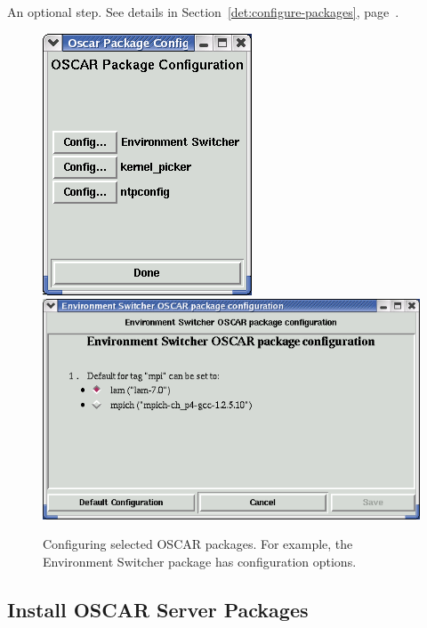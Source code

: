An optional step.  See details in
Section~\ref{det:configure-packages},
page~\pageref{det:configure-packages}.

\begin{figure}[ht!]
  \begin{center}
    \centerline{
      \includegraphics[scale=\imgscale]{figs/package-configuration}
      \hspace{\imghskip}
      \includegraphics[scale=\imgscale]{figs/package-configuration-switcher}
    }
    \caption{Configuring selected OSCAR packages.  For example, the
      Environment Switcher package has configuration options.}
    \label{fig:sbs-package-configuration}
  \end{center}
\end{figure}


\subsection{Install OSCAR Server Packages}

